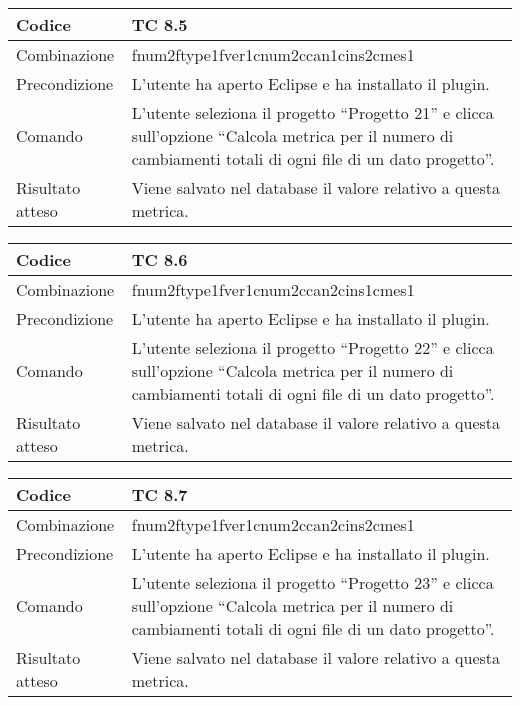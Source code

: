 \begin{table}[ht]
\begin{tabular}{|p{3cm}|p{9cm}|}
\hline
\cellcolor{lightgray}Codice				& TC 8.5								\\
\hline
\cellcolor{lightgray}Combinazione		& fnum2ftype1fver1cnum2ccan1cins2cmes1									\\
\hline
\cellcolor{lightgray}Precondizione		& L'utente ha aperto Eclipse e ha installato il plugin.		\\
\hline
\cellcolor{lightgray}Comando			& L'utente seleziona il progetto ``Progetto 21''  e clicca sull'opzione ``Calcola metrica per il numero di cambiamenti totali di ogni file di un dato progetto''.	\\
\hline
\cellcolor{lightgray}Risultato atteso	& Viene salvato nel database il valore relativo a questa metrica.\\
\hline
\end{tabular}
\end{table}

\begin{table}[ht]
\begin{tabular}{|p{3cm}|p{9cm}|}
\hline
\cellcolor{lightgray}Codice				& TC 8.6								\\
\hline
\cellcolor{lightgray}Combinazione		& fnum2ftype1fver1cnum2ccan2cins1cmes1									\\
\hline
\cellcolor{lightgray}Precondizione		& L'utente ha aperto Eclipse e ha installato il plugin.		\\
\hline
\cellcolor{lightgray}Comando			& L'utente seleziona il progetto ``Progetto 22''  e clicca sull'opzione ``Calcola metrica per il numero di cambiamenti totali di ogni file di un dato progetto''.	\\
\hline
\cellcolor{lightgray}Risultato atteso	& Viene salvato nel database il valore relativo a questa metrica.\\
\hline
\end{tabular}
\end{table}

\begin{table}[ht]
\begin{tabular}{|p{3cm}|p{9cm}|}
\hline
\cellcolor{lightgray}Codice				& TC 8.7								\\
\hline
\cellcolor{lightgray}Combinazione		& fnum2ftype1fver1cnum2ccan2cins2cmes1									\\
\hline
\cellcolor{lightgray}Precondizione		& L'utente ha aperto Eclipse e ha installato il plugin.		\\
\hline
\cellcolor{lightgray}Comando			& L'utente seleziona il progetto ``Progetto 23''  e clicca sull'opzione 
``Calcola metrica per il numero di cambiamenti totali di ogni file di un dato progetto''.	\\
\hline
\cellcolor{lightgray}Risultato atteso	& Viene salvato nel database il valore relativo a questa metrica.\\
\hline
\end{tabular}
\end{table}


